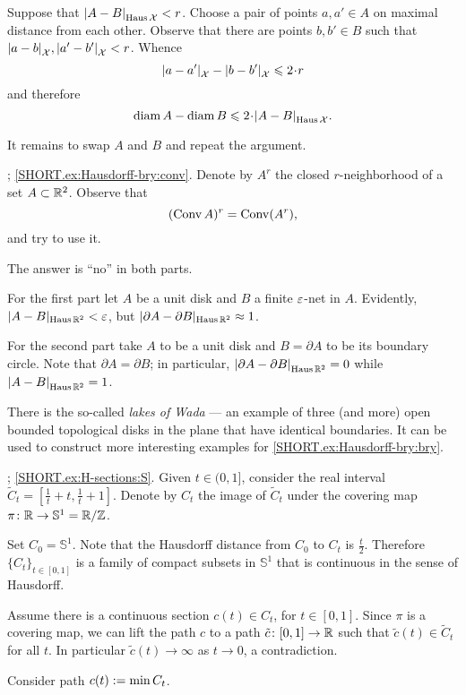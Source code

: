 Suppose that $\dist{A}{B}{\Haus\spc{X}}<r$.
Choose a pair of points $a,a'\in A$ on maximal distance from each other.
Observe that there are points $b,b'\in B$ such that 
$\dist{a}{b}{\spc{X}},\dist{a'}{b'}{\spc{X}}<r$.
Whence 
\[\dist{a}{a'}{\spc{X}}-\dist{b}{b'}{\spc{X}}\le 2\cdot r\]
and therefore
\[\diam A-\diam B\le 2\cdot\dist{A}{B}{\Haus\spc{X}}.\]

It remains to swap $A$ and $B$ and repeat the argument.


\parbf{\ref{ex:Hausdorff-bry}}; \ref{SHORT.ex:Hausdorff-bry:conv}.
Denote by $A^r$ the closed $r$-neighborhood of a set $A\z\subset \RR^2$.
Observe  that 
\[(\mathop{\rm Conv}\nolimits A)^r=\mathop{\rm Conv}\nolimits(A^r),\]
and try to use it.

The answer is ``no'' in both parts.

For the first part let $A$ be a unit disk and $B$ a finite $\varepsilon$-net in $A$.
Evidently, $|A-B|_{\operatorname{\rm Haus}\nolimits\mathbb{R}^2}<\varepsilon$, 
but
$|\partial A-\partial B|_{\operatorname{\rm Haus}\nolimits\mathbb{R}^2}\approx 1$.

For the second part take $A$ to be a unit disk and $B=\partial A$ to be its boundary circle.
Note that $\partial A=\partial B$; in particular, $\dist{\partial A}{\partial B}{\Haus\RR^2}=0$ while $\dist{ A}{B}{\Haus\RR^2}=1$.

There is the so-called {}\emph{lakes of Wada} --- an example of three (and more) open bounded topological disks in the plane that have identical boundaries.
It can be used to construct more interesting examples for \ref{SHORT.ex:Hausdorff-bry:bry}.

\parbf{\ref{ex:H-sections}};
\ref{SHORT.ex:H-sections:S}.
Given $t\in (0,1]$, consider the real interval $\tilde C_t=[\tfrac 1t+t, \tfrac 1t+1]$.
Denote by $C_t$ the image of $\tilde C_t$ under the covering map $\pi\:\RR\to \mathbb{S}^1\z=\RR/\ZZ$.

Set $C_0=\mathbb{S}^1$.
Note that the Hausdorff distance from $C_0$ to $C_t$ is $\tfrac t2$.
Therefore $\{C_t\}_{t\in[0,1]}$ is a family of compact subsets in $\mathbb{S}^1$ that is continuous in the sense of Hausdorff.

Assume there is a continuous section $c(t)\in C_t$, for $t\in [0,1]$.
Since $\pi$ is a covering map,
we can lift the path $c$ to a path $\tilde c\colon[0,1]\to \mathbb{R}$ such that $\tilde c(t)\in \tilde C_t$ for all $t$.
In particular $\tilde c(t)\to\infty$ as $t\to0$,
a contradiction.

Consider path $c(t)\mathrel{:=}\min C_t$.

